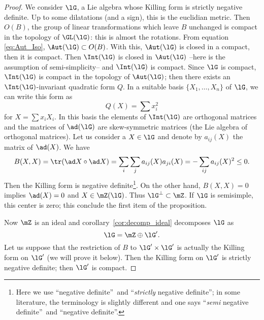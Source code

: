\begin{proof}
	We consider $\lG$, a Lie algebra whose Killing form is strictly negative definite. Up to some dilatations (and a sign), this is the euclidian metric. Then $O(B)$, the group of linear transformations which leave $B$ unchanged is compact in the topology of $\GL(\lG)$: this is almost the rotations. From equation \eqref{eq:Aut_Iso}, $\Aut(\lG)\subset O(B)$. With this, $\Aut(\lG)$ is closed in a compact, then it is compact. Then $\Int(\lG)$ is closed in $\Aut(\lG)$ --here is the assumption of semi-simplicity-- and $\Int(\lG)$ is compact.
	Since $\lG$ is compact, $\Int(\lG)$ is compact in the topology of $\Aut(\lG)$; then there exists an $\Int(\lG)$-invariant quadratic form $Q$. In a suitable basis $\{X_1,\ldots,X_n\}$ of $\lG$, we can write this form as
	\[
		Q(X)=\sum x_i^2
	\]
	for $X=\sum x_iX_i$. In this basis the elements of $\Int(\lG)$ are orthogonal matrices and the matrices of $\ad(\lG)$ are skew-symmetric matrices (the Lie algebra of orthogonal matrices). Let us consider a $X\in\lG$ and denote by $a_{ij}(X)$ the matrix of $\ad(X)$. We have
	\begin{equation}
		\begin{split}
			B(X,X)=\tr(\ad X\circ\ad X)
			=\sum_i\sum_ja_{ij}(X)a_{ji}(X)
			=-\sum_{ij}a_{ij}(X)^2\leq 0.
		\end{split}
	\end{equation}
	Then the Killing form is negative definite\footnote{Here we use ``negative definite''\ and ``\emph{strictly} negative definite''; in some literature, the terminology is slightly different and one says ``\emph{semi} negative definite''\ and ``negative definite''.}. On the other hand, $B(X,X)=0$ implies $\ad(X)=0$ and $X\in\mZ(\lG)$. Thus $\lG^{\perp}\subset\mZ$. If $\lG$ is semisimple, this center is zero; this conclude the first item of the proposition.

	Now $\mZ$ is an ideal and corollary~\ref{cor:decomp_ideal} decomposes $\lG$ as
	\begin{equation}
		\lG=\mZ\oplus\lG'.
	\end{equation}
	Let us suppose that the restriction of $B$ to $\lG'\times\lG'$ is actually the Killing form on $\lG'$ (we will prove it below). Then the Killing form on $\lG'$ is strictly negative definite; then $\lG'$ is compact.


\end{proof}
